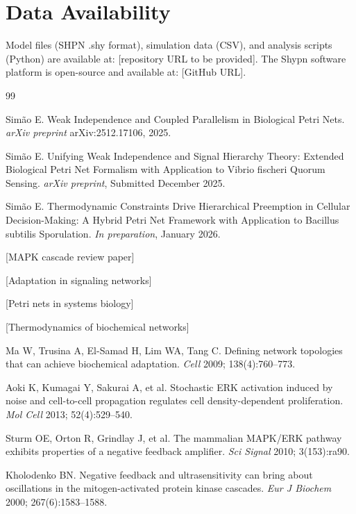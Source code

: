 \documentclass[twocolumn,11pt]{article}
\begin{document}
\section*{Data Availability}

Model files (SHPN .shy format), simulation data (CSV), and analysis scripts (Python) are available at: [repository URL to be provided]. The Shypn software platform is open-source and available at: [GitHub URL].




\begin{thebibliography}{99}

Simão E. Weak Independence and Coupled Parallelism in Biological Petri Nets. \textit{arXiv preprint} arXiv:2512.17106, 2025.

Simão E. Unifying Weak Independence and Signal Hierarchy Theory: Extended Biological Petri Net Formalism with Application to Vibrio fischeri Quorum Sensing. \textit{arXiv preprint}, Submitted December 2025.

Simão E. Thermodynamic Constraints Drive Hierarchical Preemption in Cellular Decision-Making: A Hybrid Petri Net Framework with Application to Bacillus subtilis Sporulation. \textit{In preparation}, January 2026.

[MAPK cascade review paper]

[Adaptation in signaling networks]

[Petri nets in systems biology]

[Thermodynamics of biochemical networks]

Ma W, Trusina A, El-Samad H, Lim WA, Tang C. Defining network topologies that can achieve biochemical adaptation. \textit{Cell} 2009; 138(4):760--773.

Aoki K, Kumagai Y, Sakurai A, et al. Stochastic ERK activation induced by noise and cell-to-cell propagation regulates cell density-dependent proliferation. \textit{Mol Cell} 2013; 52(4):529--540.

Sturm OE, Orton R, Grindlay J, et al. The mammalian MAPK/ERK pathway exhibits properties of a negative feedback amplifier. \textit{Sci Signal} 2010; 3(153):ra90.

Kholodenko BN. Negative feedback and ultrasensitivity can bring about oscillations in the mitogen-activated protein kinase cascades. \textit{Eur J Biochem} 2000; 267(6):1583--1588.

\end{thebibliography}
\end{document}
